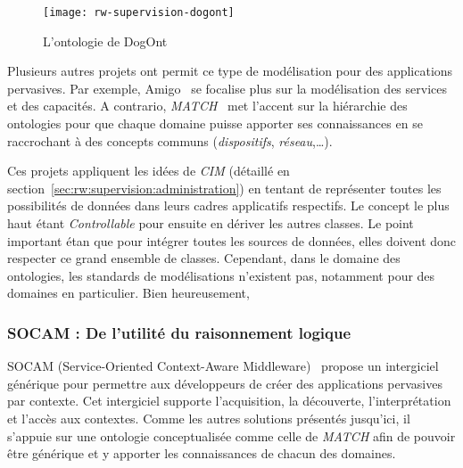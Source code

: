 \begin{figure}[ht]
    \centering
    \texttt{[image: rw-supervision-dogont]}
    \caption{L'ontologie de DogOnt}\label{fig:rw:supervision:dogont}
\end{figure}

Plusieurs autres projets ont permit ce type de modélisation pour des applications pervasives. Par exemple, Amigo~\cite{BenMokhtar:easy} se focalise plus sur la modélisation des services et des capacités. A contrario, \textit{MATCH}~\cite{Docherty:match} met l'accent sur la hiérarchie des ontologies pour que chaque domaine puisse apporter ses connaissances en se raccrochant à des concepts communs (\textit{dispositifs}, \textit{réseau},\dots).

Ces projets appliquent les idées de \textit{CIM} (détaillé en section~\ref{sec:rw:supervision:administration}) en tentant de représenter toutes les possibilités de données dans leurs cadres applicatifs respectifs. Le concept le plus haut étant \textit{Controllable} pour ensuite en dériver les autres classes. Le point important étan que pour intégrer toutes les sources de données, elles doivent donc respecter ce grand ensemble de classes. Cependant, dans le domaine des ontologies, les standards de modélisations n'existent pas, notamment pour des domaines en particulier. Bien heureusement, 

\subsubsection{SOCAM : De l'utilité du raisonnement logique}
SOCAM (Service-Oriented Context-Aware Middleware)~\cite{Gu:socam} propose un intergiciel générique pour permettre aux développeurs de créer des applications pervasives par contexte. Cet intergiciel supporte l'acquisition, la découverte, l'interprétation et l'accès aux contextes. Comme les autres solutions présentés jusqu'ici, il s'appuie sur une ontologie conceptualisée comme celle de \textit{MATCH} afin de pouvoir être générique et y apporter les connaissances de chacun des domaines.


